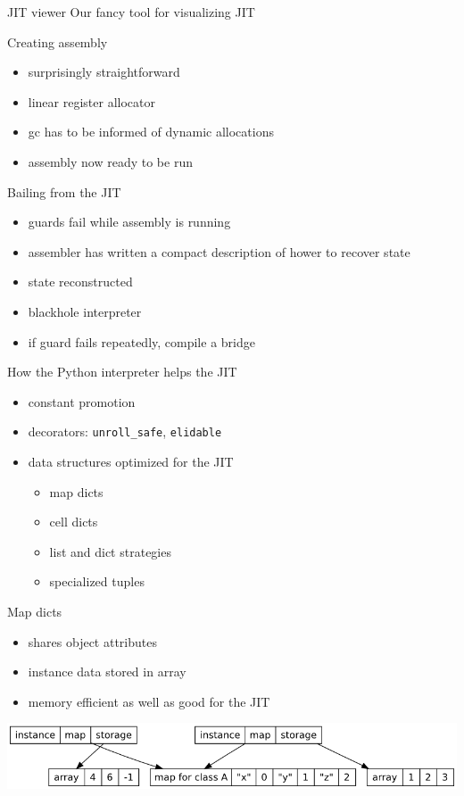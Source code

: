 \documentclass[14pt]{beamer}
\begin{document}
\begin{frame}{JIT viewer}
Our fancy tool for visualizing JIT
\end{frame}

\begin{frame}{Creating assembly}
\begin{itemize}
\item surprisingly straightforward
\item linear register allocator
\item gc has to be informed of dynamic allocations
\item assembly now ready to be run
\end{itemize}
\end{frame}

\begin{frame}{Bailing from the JIT}
\begin{itemize}
\item guards fail while assembly is running
\item assembler has written a compact description of hower to recover state
\item state reconstructed
\item blackhole interpreter
\item if guard fails repeatedly, compile a bridge
\end{itemize}
\end{frame}

\begin{frame}[fragile]{How the Python interpreter helps the JIT}
\begin{itemize}
\item constant promotion
\item decorators: \verb+unroll_safe+, \verb+elidable+
\item data structures optimized for the JIT
\begin{itemize}
\item map dicts
\item cell dicts
\item list and dict strategies
\item specialized tuples
\end{itemize}
\end{itemize}
\end{frame}

\begin{frame}{Map dicts}
\begin{itemize}
\item shares object attributes
\item instance data stored in array
\item memory efficient as well as good for the JIT
\end{itemize}
\includegraphics[scale=.45]{instancemap.png}
\end{frame}
\end{document}
